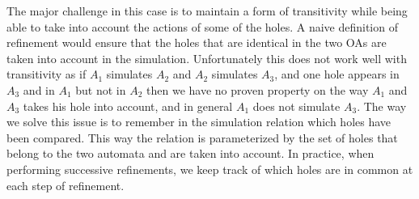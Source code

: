 \documentclass[runningheads]{llncs}
\begin{document}
The major challenge in this case is to maintain a form of transitivity while being able to take into account the actions of some of the holes. A naive definition of refinement would ensure that the holes that are identical in the two OAs are taken into account in the simulation. Unfortunately this does not work well with transitivity as if $A_1$ simulates $A_2$ and $A_2$ simulates $A_3$, and one hole appears in $A_3$ and in $A_1$ but not in $A_2$ then we have no proven property on the way $A_1$ and $A_3$ takes his hole into account, and in general  $A_1$ does not simulate $A_3$. The way we solve this issue is to remember in the simulation relation which holes have been compared. This way the relation is parameterized by the set of holes that belong to the two automata and are taken into account.
In practice, when performing successive refinements, we  keep track of which holes are in common at each step of refinement.
\end{document}
